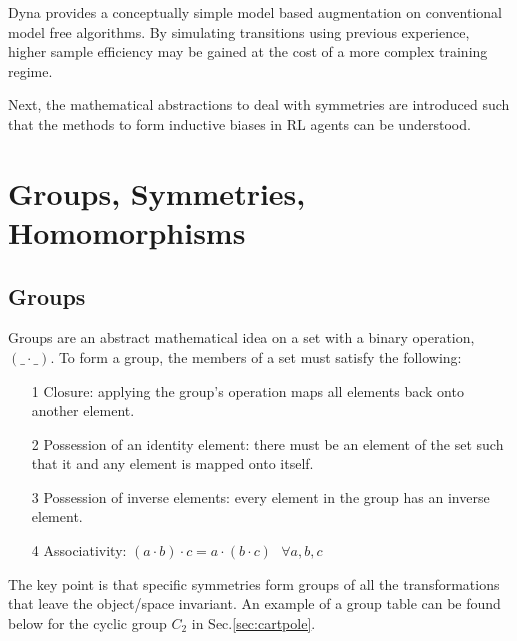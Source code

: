 Dyna provides a conceptually simple model based augmentation on conventional model free algorithms. By simulating transitions using previous experience, higher sample efficiency may be gained at the cost of a more complex training regime.

Next, the mathematical abstractions to deal with symmetries are introduced such that the methods to form inductive biases in RL agents can be understood.
\section{Groups, Symmetries, Homomorphisms}

\subsection{Groups}
Groups are an abstract mathematical idea on a set with a binary operation, $(\text{\_}\cdot \text{\_})$. To form a group, the members of a set must satisfy the following:
\begin{itemize}
	\item[1] Closure: applying the group's operation maps all elements back onto another element.
	\item[2] Possession of an identity element: there must be an element of the set such that it and any element is mapped onto itself.
	\item[3] Possession of inverse elements: every element in the group has an inverse element.
	\item [4] Associativity: $(a \cdot b) \cdot c = a \cdot (b \cdot c) \text{  }\forall a, b, c$
\end{itemize}
The key point is that specific symmetries form groups of all the transformations that leave the object/space invariant. An example of a group table can be found below for the cyclic group $C_2$ in Sec.\ref{sec:cartpole}.

